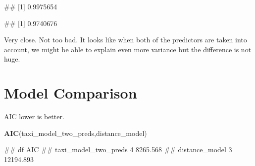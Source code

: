 \documentclass[
]{book}
\newenvironment{Shaded}{\begin{snugshade}}{\end{snugshade}}
\newcommand{\FunctionTok}[1]{\textcolor[rgb]{0.13,0.29,0.53}{\textbf{#1}}}
\newcommand{\NormalTok}[1]{#1}
\newcommand{\SpecialCharTok}[1]{\textcolor[rgb]{0.81,0.36,0.00}{\textbf{#1}}}
\begin{document}
\begin{Shaded}
\end{Shaded}

\begin{Shaded}
\begin{Highlighting}[]
\NormalTok{\#\# [1] 0.9975654}
\end{Highlighting}
\end{Shaded}

\begin{Shaded}
\end{Shaded}

\begin{Shaded}
\begin{Highlighting}[]
\NormalTok{\#\# [1] 0.9740676}
\end{Highlighting}
\end{Shaded}

Very close. Not too bad. It looks like when both of the predictors are taken into account, we might be able to explain even more variance but the difference is not huge.

\section{Model Comparison}\label{model-comparison}

AIC lower is better.

\begin{Shaded}
\begin{Highlighting}[]
\FunctionTok{AIC}\NormalTok{(taxi\_model\_two\_preds,distance\_model)}
\end{Highlighting}
\end{Shaded}

\begin{Shaded}
\begin{Highlighting}[]
\NormalTok{\#\#                      df       AIC}
\NormalTok{\#\# taxi\_model\_two\_preds  4  8265.568}
\NormalTok{\#\# distance\_model        3 12194.893}
\end{Highlighting}
\end{Shaded}
\end{document}
